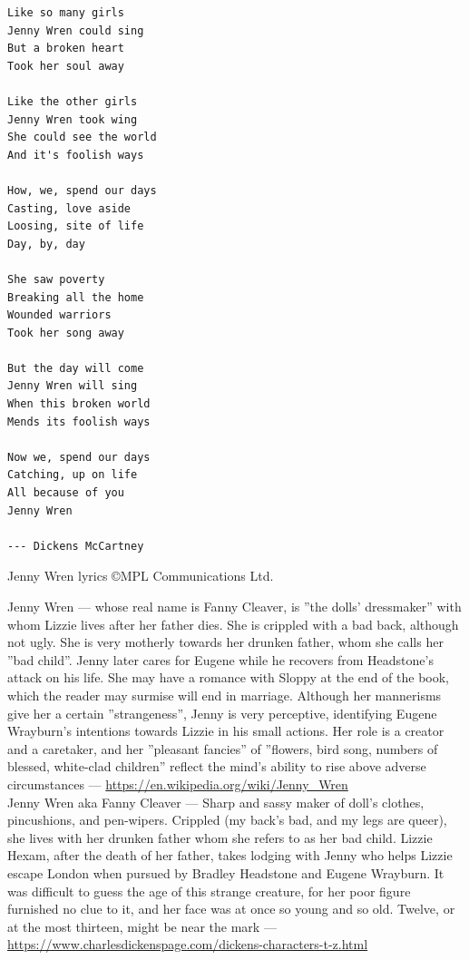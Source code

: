 \documentclass[12pt]{book}
\begin{document}
\begin{verbatim}
Like so many girls
Jenny Wren could sing
But a broken heart
Took her soul away

Like the other girls
Jenny Wren took wing
She could see the world
And it's foolish ways

How, we, spend our days
Casting, love aside
Loosing, site of life
Day, by, day

She saw poverty
Breaking all the home
Wounded warriors
Took her song away

But the day will come
Jenny Wren will sing
When this broken world
Mends its foolish ways

Now we, spend our days
Catching, up on life
All because of you
Jenny Wren

--- Dickens McCartney
\end{verbatim}

\noindent
Jenny Wren lyrics \copyright MPL Communications Ltd.
\newpage

\noindent
Jenny Wren --- whose real name is Fanny Cleaver,
is ''the dolls' dressmaker'' with whom Lizzie lives after her father dies.
She is crippled with a bad back, although not ugly.
She is very motherly towards her drunken father, whom she calls her ''bad child''.
Jenny later cares for Eugene while he recovers from Headstone's attack on his life.
She may have a romance with Sloppy at the end of the book,
which the reader may surmise will end in marriage.
Although her mannerisms give her a certain ''strangeness'', Jenny is very perceptive,
identifying Eugene Wrayburn's intentions towards Lizzie in his small actions.
Her role is a creator and a caretaker, 
and her ''pleasant fancies'' of ''flowers, bird song, numbers of blessed, 
white-clad children'' reflect the mind's ability to rise above adverse 
circumstances --- \url{https://en.wikipedia.org/wiki/Jenny_Wren}
\\[1pt]

\noindent
Jenny Wren aka Fanny Cleaver --- Sharp and sassy maker of doll's clothes, 
pincushions, and pen-wipers. 
Crippled (my back’s bad, and my legs are queer),
she lives with her drunken father whom she refers to as her bad child.
Lizzie Hexam, after the death of her father,
takes lodging with Jenny who helps Lizzie escape London when pursued by Bradley Headstone and Eugene Wrayburn.
It was difficult to guess the age of this strange creature,
for her poor figure furnished no clue to it,
and her face was at once so young and so old. Twelve,
or at the most thirteen, might be near the mark --- 
\url{https://www.charlesdickenspage.com/dickens-characters-t-z.html}
\\[1pt]
\end{document}
